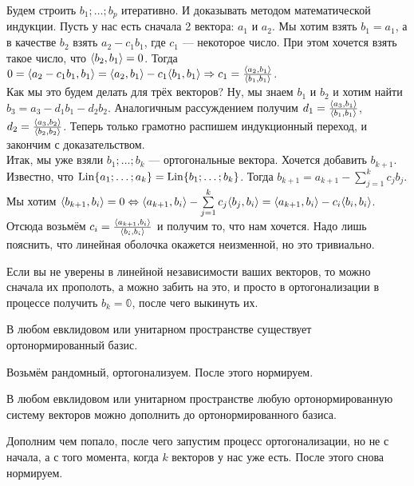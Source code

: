 \documentclass{article}
\begin{document}
\begin{itemize}
\begin{Proof}
            Будем строить $b_1;\ldots;b_p$ итеративно. И доказывать методом математической индукции. Пусть у нас есть сначала 2 вектора: $a_1$ и $a_2$. Мы хотим взять $b_1=a_1$, а в качестве $b_2$ взять $a_2-c_1b_1$, где $c_1$ --- некоторое число. При этом хочется взять такое число, что ${\left\langle{b_2},{b_1}\right\rangle}=0$. Тогда $0={\left\langle{a_2-c_1b_1},{b_1}\right\rangle}={\left\langle{a_2},{b_1}\right\rangle}-c_1{\left\langle{b_1},{b_1}\right\rangle}\Rightarrow c_1=\frac{{\left\langle{a_2},{b_1}\right\rangle}}{{\left\langle{b_1},{b_1}\right\rangle}}$.\\
            Как мы это будем делать для трёх векторов? Ну, мы знаем $b_1$ и $b_2$ и хотим найти $b_3=a_3-d_1b_1-d_2b_2$. Аналогичным рассуждением получим $d_1=\frac{{\left\langle{a_3},{b_1}\right\rangle}}{{\left\langle{b_1},{b_1}\right\rangle}}$, $d_2=\frac{{\left\langle{a_3},{b_2}\right\rangle}}{{\left\langle{b_2},{b_2}\right\rangle}}$. Теперь только грамотно распишем индукционный переход, и закончим с доказательством.\\
            Итак, мы уже взяли $b_1;\ldots;b_k$ --- ортогональные вектора. Хочется добавить $b_{k+1}$. Известно, что $\operatorname{Lin}\{a_1;\ldots;a_k\}=\operatorname{Lin}\{b_1;\ldots;b_k\}$. Тогда $b_{k+1}=a_{k+1}-\sum\limits_{j=1}^kc_jb_j$. Мы хотим ${\left\langle{b_{k+1}},{b_i}\right\rangle}=0\Leftrightarrow {\left\langle{a_{k+1}},{b_i}\right\rangle}-\sum\limits_{j=1}^kc_j{\left\langle{b_j},{b_i}\right\rangle}={\left\langle{a_{k+1}},{b_i}\right\rangle}-c_i{\left\langle{b_i},{b_i}\right\rangle}$. Отсюда возьмём $c_i=\frac{{\left\langle{a_{k+1}},{b_i}\right\rangle}}{{\left\langle{b_i},{b_i}\right\rangle}}$ и получим то, что нам хочется. Надо лишь пояснить, что линейная оболочка окажется неизменной, но это тривиально.
        \end{Proof}
        \begin{Comment}
            Если вы не уверены в линейной независимости ваших векторов, то можно сначала их прополоть, а можно забить на это, и просто в ортогонализации в процессе получить $b_k=\mathbb0$, после чего выкинуть их.
        \end{Comment}
        \thm В любом евклидовом или унитарном пространстве существует ортонормированный базис.
        \begin{Proof}
            Возьмём рандомный, ортогонализуем. После этого нормируем.
        \end{Proof}
        \thm В любом евклидовом или унитарном пространстве любую ортонормированную систему векторов можно дополнить до ортонормированного базиса.
        \begin{Proof}
            Дополним чем попало, после чего запустим процесс ортогонализации, но не с начала, а с того момента, когда $k$ векторов у нас уже есть. После этого снова нормируем.
        \end{Proof}
        \begin{Example}

\end{Example}
\end{itemize}
\end{document}

